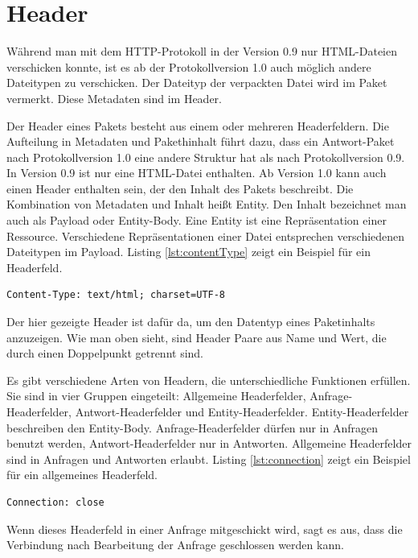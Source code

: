 \documentclass{llncs}
\begin{document}
\section{Header}
Während man mit dem HTTP-Protokoll in der Version 0.9 nur HTML-Dateien
verschicken konnte, ist es ab der Protokollversion 1.0 auch möglich andere
Dateitypen zu verschicken. Der Dateityp der verpackten Datei wird im Paket
vermerkt. Diese Metadaten sind im Header.

Der Header eines Pakets besteht aus einem oder mehreren Headerfeldern.
Die Aufteilung in Metadaten und Pakethinhalt führt dazu, dass ein Antwort-Paket nach Protokollversion 1.0 eine andere Struktur hat als nach
Protokollversion 0.9. In Version 0.9 ist nur eine HTML-Datei enthalten.
Ab Version 1.0 kann auch einen Header enthalten sein, der den
Inhalt des Pakets beschreibt. Die Kombination von Metadaten und Inhalt heißt Entity. Den Inhalt bezeichnet man auch als Payload oder Entity-Body. Eine Entity ist eine Repräsentation einer Ressource. Verschiedene Repräsentationen einer Datei entsprechen verschiedenen Dateitypen im Payload. \cite{Berners-Lee1996} 
Listing \ref{lst:contentType} zeigt ein Beispiel für ein Headerfeld.
\begin{lstlisting}[caption={Content-Type Headerfeld},label={lst:contentType}]
Content-Type: text/html; charset=UTF-8
\end{lstlisting} 

Der hier gezeigte Header ist dafür da, um den Datentyp eines Paketinhalts anzuzeigen. Wie man oben sieht, sind Header Paare aus Name und Wert, die durch einen Doppelpunkt getrennt sind.

Es gibt verschiedene Arten von Headern, die unterschiedliche Funktionen erfüllen. Sie sind in vier Gruppen eingeteilt: Allgemeine Headerfelder, Anfrage-Headerfelder, Antwort-Headerfelder und Entity-Headerfelder.
Entity-Headerfelder beschreiben den Entity-Body. Anfrage-Headerfelder dürfen nur in Anfragen benutzt werden, Antwort-Headerfelder nur in Antworten.  Allgemeine Headerfelder sind in Anfragen und Antworten erlaubt. Listing \ref{lst:connection} zeigt ein Beispiel für ein allgemeines Headerfeld. 

\begin{lstlisting}[caption={Connection-Headerfeld},label={lst:connection}]
Connection: close
\end{lstlisting}

Wenn dieses Headerfeld in einer Anfrage mitgeschickt wird, sagt es aus, dass die Verbindung nach Bearbeitung der Anfrage geschlossen werden kann. 
\end{document}
